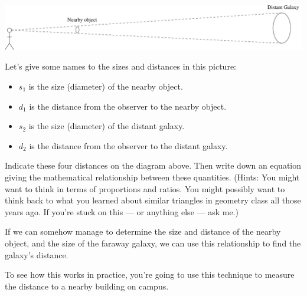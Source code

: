 \centerline{\includegraphics[width=6in]{localdistance/localdistance1.pdf}}

Let's give some names to the sizes and distances in this picture:
\begin{itemize}
\item $s_1$ is the size (diameter) of the nearby object.
\item $d_1$ is the distance from the observer to the nearby object.
\item $s_2$ is the size (diameter) of the distant galaxy.
\item $d_2$ is the distance from the observer to the distant galaxy.
\end{itemize}

Indicate these four distances on the diagram above.  Then write down 
an equation giving the mathematical relationship between these
quantities.  (Hints: You might want to think in terms of 
proportions and ratios.  You might possibly want to think back to 
what you learned about similar triangles in geometry class all those years ago.
If you're stuck on this --- or anything else --- ask me.)

\vskip 1in

If we can somehow manage to determine the size and distance of
the nearby object, and the size of the faraway galaxy, we can 
use this relationship to find the galaxy's distance.

To see how this works in practice, you're going to use this
technique to measure the distance to a nearby building on campus.

